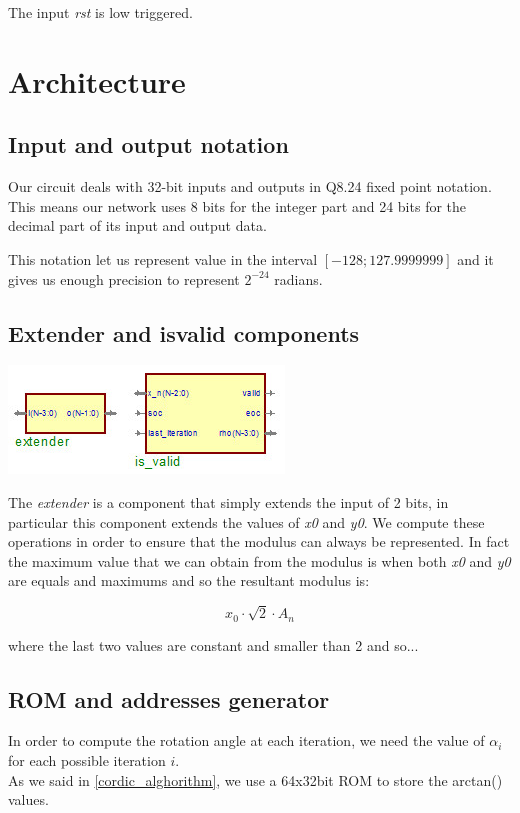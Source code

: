 \documentclass[12pt,a4paper]{report}
\begin{document}
The input \emph{rst} is low triggered.


\chapter{Architecture}

\section{Input and output notation}
Our circuit deals with 32-bit inputs and outputs in Q8.24 fixed point notation. This means our network uses 8 bits for the integer part and 24 bits for the decimal part of its input and output data.

This notation let us represent value in the interval $ \left[ -128; 127.9999999 \right]$ and it gives us enough precision to represent $2^{-24}$ radians.

\section{Extender and is\textunderscore valid components}
\begin{center}
\includegraphics{img/isvalid.jpg}\\
\end{center}
The \emph{extender} is a component that simply extends the input of 2 bits, in particular this component extends the values of \emph{x0} and \emph{y0}. We compute these operations in order to ensure that the modulus can always be represented. In fact the maximum value that we can obtain from the modulus is when both \emph{x0} and \emph{y0} are equals and maximums and so the resultant modulus is:

\begin{equation}
x_{0} \cdot \sqrt{2} \cdot A_{n}
\end{equation}

where the last two values are constant and smaller than 2 and so...


\section{ROM and addresses generator}
In order to compute the rotation angle at each iteration, we need the value of $\alpha_{i}$ for each possible iteration $i$.\\
As we said in \ref{cordic_alghorithm}, we use a 64x32bit ROM to store the arctan() values.
\end{document}
